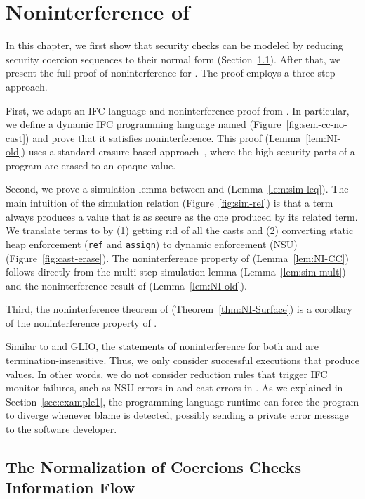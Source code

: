 \chapter{Noninterference of \Surface}
\label{ch:noninterference}

In this chapter, we first show that security checks can be modeled by reducing
security coercion sequences to their normal form (Section~\ref{sec:norm-IF}).
After that, we present the full proof of noninterference for \Surface. The proof
employs a three-step approach.

First, we adapt an IFC language and noninterference proof from
\textcite{Chen:2022aa}. In particular, we define a dynamic IFC programming
language named \DynIFC (Figure~\ref{fig:sem-cc-no-cast}) and prove that it
satisfies noninterference. This proof (Lemma~\ref{lem:NI-old}) uses a standard
erasure-based approach~\parencite{LI20101974, stefan2011flexible,
  stefan2012flexible, Fennell:2013ab, STEFAN:2017ta}, where the high-security
parts of a program are erased to an opaque value.

Second, we prove a simulation lemma between \CC and \DynIFC
(Lemma~\ref{lem:sim-leq}).  The main intuition of the simulation
relation (Figure~\ref{fig:sim-rel}) is that a \CC term always produces
a value that is as secure as the one produced by its related \DynIFC
term. We translate \CC terms to \DynIFC by (1) getting rid of all the
casts and (2) converting static heap enforcement (\texttt{ref}
and \texttt{assign}) to dynamic enforcement (NSU)
(Figure~\ref{fig:cast-erase}).  The noninterference property of \CC
(Lemma~\ref{lem:NI-CC}) follows directly from the multi-step
simulation lemma (Lemma~\ref{lem:sim-mult}) and the noninterference
result of \DynIFC (Lemma~\ref{lem:NI-old}).

Third, the noninterference theorem of \Surface
(Theorem~\ref{thm:NI-Surface}) is a corollary of the noninterference
property of \CC.

Similar to \GSLRef and GLIO, the statements of noninterference for
both \DynIFC and \CC are termination-insensitive.  Thus, we only
consider successful executions that produce values.  In other words,
we do not consider reduction rules that trigger IFC monitor failures,
such as NSU errors in \DynIFC and cast errors in \CC.  As we explained
in Section~\ref{sec:example1}, the programming language runtime can
force the program to diverge whenever blame is detected, possibly
sending a private error message to the software developer.

\section{The Normalization of Coercions Checks Information Flow}
\label{sec:norm-IF}

